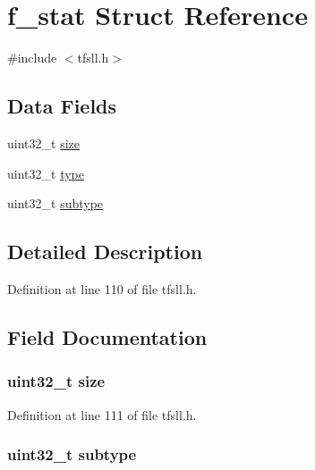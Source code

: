 \hypertarget{structf__stat}{}\section{f\+\_\+stat Struct Reference}
\label{structf__stat}


{\ttfamily \#include $<$tfsll.\+h$>$}

\subsection*{Data Fields}
\begin{DoxyCompactItemize}
\item 
uint32\+\_\+t \hyperlink{structf__stat_ab2c6b258f02add8fdf4cfc7c371dd772}{size}
\item 
uint32\+\_\+t \hyperlink{structf__stat_ad44b615021ed3ccb734fcaf583ef4a03}{type}
\item 
uint32\+\_\+t \hyperlink{structf__stat_aed06f4a516930ca81d204d53c61a1ef3}{subtype}
\end{DoxyCompactItemize}


\subsection{Detailed Description}


Definition at line 110 of file tfsll.\+h.



\subsection{Field Documentation}
\hypertarget{structf__stat_ab2c6b258f02add8fdf4cfc7c371dd772}{}
\subsubsection[{size}]{\setlength{\rightskip}{0pt plus 5cm}uint32\+\_\+t size}\label{structf__stat_ab2c6b258f02add8fdf4cfc7c371dd772}


Definition at line 111 of file tfsll.\+h.

\hypertarget{structf__stat_aed06f4a516930ca81d204d53c61a1ef3}{}
\subsubsection[{subtype}]{\setlength{\rightskip}{0pt plus 5cm}uint32\+\_\+t subtype}\label{structf__stat_aed06f4a516930ca81d204d53c61a1ef3}


